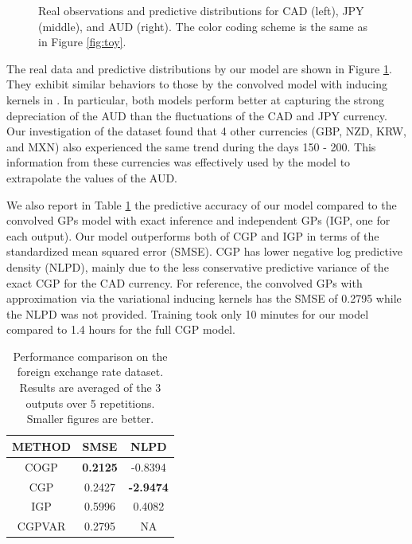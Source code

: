 \begin{figure}
\begin{tabular}{ccc}
\end{tabular}
\caption{Real observations and predictive distributions for CAD (left), JPY (middle), and AUD (right). The color coding scheme is the same as in Figure \ref{fig:toy}.}
\label{fig:fx}
\end{figure}

The real data and predictive distributions by our model are shown in Figure \ref{fig:fx}.
They exhibit similar behaviors to those by the convolved model with inducing kernels in \citep{alvarez2010efficient}.
In particular, both models perform better at capturing the strong depreciation of the AUD than the fluctuations of the CAD and JPY currency.
Our investigation of the dataset found that 4 other currencies (GBP, NZD, KRW, and MXN) also experienced the same trend during the days 150 - 200.
This information from these currencies was effectively used by the model to extrapolate the values of the AUD.

We also report in Table \ref{tab:fx} the predictive accuracy of our model compared to the convolved GPs model with exact inference \citep[CGP,][]{alvarez-lawrence-nips-08} and independent GPs (IGP, one for each output).
Our model outperforms both of CGP and IGP in terms of the standardized mean squared error (SMSE).
CGP has lower negative log predictive density (NLPD), mainly due to the less conservative predictive variance of the exact CGP for the CAD currency.
For reference, the convolved GPs with approximation via the variational inducing kernels  \citep[CGPVAR,][]{alvarez2010efficient} has the SMSE of 0.2795 while the NLPD was not provided.
Training took only 10 minutes for our model compared to 1.4 hours for the full CGP model.

\setlength{\tabcolsep}{4pt}
\begin{table}[t]
\caption{Performance comparison on the foreign exchange rate dataset. Results are averaged of the 3 outputs over 5 repetitions. Smaller figures are better.}
\label{tab:fx}
\begin{center}
\begin{tabular}{ccc}
\toprule
\textbf{METHOD} & \textbf{SMSE} & \textbf{NLPD} \\ \hline
COGP  & \textbf{0.2125} & -0.8394 \\
CGP & 0.2427 & \textbf{-2.9474} \\
IGP & 0.5996 & 0.4082 \\
CGPVAR & 0.2795 & NA \\
\bottomrule
\end{tabular}
\end{center}
\end{table}

